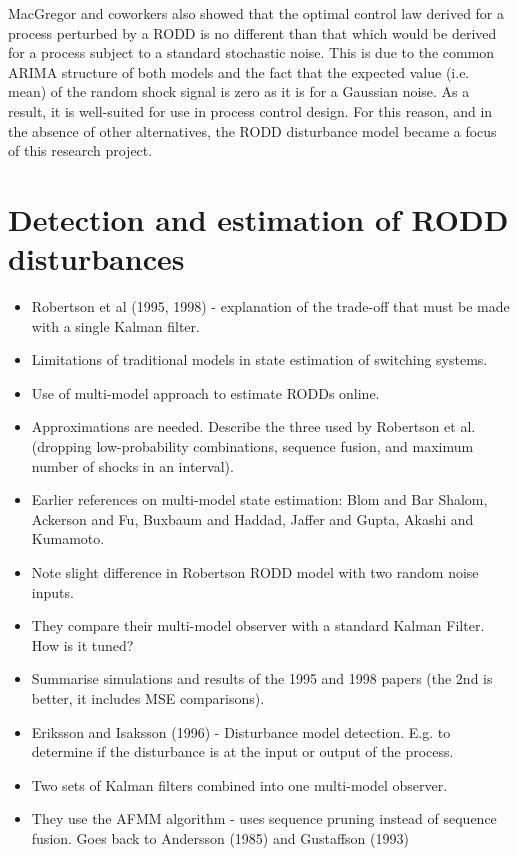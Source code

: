 MacGregor and coworkers also showed that the optimal control law derived for a process perturbed by a RODD is no different than that which would be derived for a process subject to a standard stochastic noise.  This is due to the common ARIMA structure of both models and the fact that the expected value (i.e. mean) of the random shock signal is zero as it is for a Gaussian noise. As a result, it is well-suited for use in process control design. For this reason, and in the absence of other alternatives, the RODD disturbance model became a focus of this research project.

\section*{Detection and estimation of RODD disturbances}\label{detection_RODDs}

\begin{itemize}
	\item Robertson et al (1995, 1998) - explanation of the trade-off that must be made with a single Kalman filter.
	\item Limitations of traditional models in state estimation of switching systems.
	\item Use of multi-model approach to estimate RODDs online.
	\item Approximations are needed.  Describe the three used by Robertson et al. (dropping low-probability combinations, sequence fusion, and maximum number of shocks in an interval).
	\item Earlier references on multi-model state estimation: Blom and Bar Shalom, Ackerson and Fu, Buxbaum and Haddad, Jaffer and Gupta, Akashi and Kumamoto.
	\item Note slight difference in Robertson RODD model with two random noise inputs.
	\item They compare their multi-model observer with a standard Kalman Filter. How is it tuned?
	\item Summarise simulations and results of the 1995 and 1998 papers (the 2nd is better, it includes MSE comparisons).
	\item Eriksson and Isaksson (1996) - Disturbance model detection. E.g. to determine if the disturbance is at the input or output of the process.
	\item Two sets of Kalman filters combined into one multi-model observer.
	\item They use the AFMM algorithm - uses sequence pruning instead of sequence fusion. Goes back to Andersson (1985) and Gustaffson (1993)
\end{itemize}

